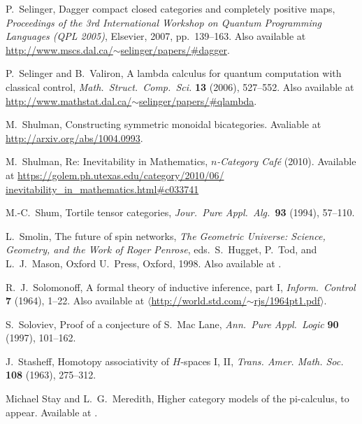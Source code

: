\documentclass[12pt,twoside,openright]{report}
\begin{document}
\begin{thebibliography}{99}
 P.\ Selinger, Dagger compact closed categories and completely positive maps, {\sl Proceedings of the 3rd International Workshop on Quantum Programming Languages (QPL 2005)}, Elsevier, 2007, pp.\ 139--163. Also available at \href{http://www.mscs.dal.ca/~selinger/papers/#dagger}
{http://www.mscs.dal.ca/$\sim$selinger/papers/\#dagger}.

 P.\ Selinger and B.\ Valiron, A lambda calculus for quantum computation with classical control,
{\sl Math.\ Struct.\ Comp.\ Sci.} {\bf 13} (2006), 527--552. Also available at \hfill \break 
\href{http://www.mathstat.dal.ca/~selinger/papers/#qlambda}
{http://www.mathstat.dal.ca/$\sim$selinger/papers/\#qlambda}.

 M.\ Shulman, Constructing symmetric monoidal bicategories.  Avaliable at \href{http://arxiv.org/abs/1004.0993}{http://arxiv.org/abs/1004.0993}.

 M.\ Shulman, Re: Inevitability in Mathematics,
{\sl $n$-Category Caf\'e} (2010).  Available at
\href{https://golem.ph.utexas.edu/category/2010/06/inevitability_in_mathematics.html#c033741}
{https://golem.ph.utexas.edu/category/2010/06/}\\
\href{https://golem.ph.utexas.edu/category/2010/06/inevitability_in_mathematics.html#c033741}
{inevitability\_in\_mathematics.html\#c033741}

M.-C.\ Shum, Tortile tensor categories,
\textsl{Jour.\ Pure Appl.\ Alg.\ }\textbf{93} (1994), 57--110.

 L.\ Smolin, The future of spin networks, 
{\sl The Geometric Universe: Science, Geometry, and the Work of Roger Penrose}, eds.\ S.\ Hugget, P.\ Tod, and L.\ J.\ Mason, Oxford U.\ Press, Oxford, 1998.  Also available at .

 R.\ J.\ Solomonoff, A formal theory of inductive inference, part I, {\sl Inform.\ Control} {\bf 7} (1964),
1--22.  Also available at 
\hfill \break
\href{http://world.std.com/~rjs/1964pt1.pdf}
{$\langle$http://world.std.com/$\sim$rjs/1964pt1.pdf$\rangle$}.

 S.\ Soloviev, Proof of a conjecture of S.\ Mac Lane, {\sl Ann.\ Pure Appl.\ Logic} {\bf 90} (1997), 101--162.

 J.\ Stasheff, Homotopy associativity of $H$-spaces I, II, \textsl{Trans. Amer. Math. Soc.} \textbf{108} (1963), 275--312.

 Michael Stay and L.\ G.\ Meredith, Higher category models of the pi-calculus, to appear.  Available at .


\end{thebibliography}
\end{document}

